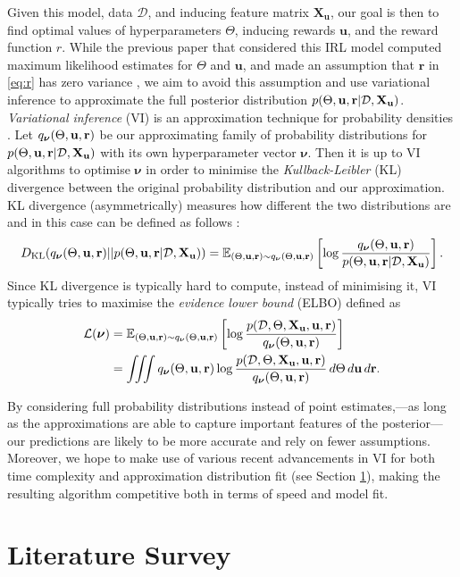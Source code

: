 \documentclass{mprop}
\theoremstyle{definition}
\begin{document}
Given this model, data $\mathcal{D}$, and inducing feature matrix
$\mathbf{X_u}$, our goal is then to find optimal values of hyperparameters
$\Theta$, inducing rewards $\mathbf{u}$, and the reward function $r$. While the
previous paper that considered this IRL model computed maximum likelihood estimates
for $\Theta$ and $\mathbf{u}$, and made an assumption that $\mathbf{r}$ in
\eqref{eq:r} has zero variance \cite{DBLP:conf/nips/LevinePK11}, we aim to
avoid this assumption and use variational inference to approximate the full
posterior distribution $p(\Theta, \mathbf{u}, \mathbf{r} | \mathcal{D}, \mathbf{X_u})$. \emph{Variational inference} (VI) is an
approximation technique for probability densities \cite{blei2017variational}.
Let $q_{\bm\nu}(\Theta, \mathbf{u}, \mathbf{r})$ be our approximating family of probability distributions
for $p(\Theta, \mathbf{u}, \mathbf{r} | \mathcal{D}, \mathbf{X_u})$ with its own hyperparameter vector $\bm\nu$. Then it is up
to VI algorithms to optimise $\bm\nu$ in order to minimise the
\emph{Kullback-Leibler} (KL) divergence between the original probability
distribution and our approximation.  KL divergence (asymmetrically) measures how
different the two distributions are and in this case can be defined as follows
\cite{blei2017variational}:
\[ D_{\mathrm{KL}}(q_{\bm\nu}(\Theta, \mathbf{u}, \mathbf{r}) || p(\Theta, \mathbf{u}, \mathbf{r} | \mathcal{D}, \mathbf{X_u})) = \mathbb{E}_{(\Theta, \mathbf{u}, \mathbf{r}) \sim q_{\bm\nu}(\Theta, \mathbf{u}, \mathbf{r})} \left[ \log
  \frac{q_{\bm\nu}(\Theta, \mathbf{u}, \mathbf{r})}{p(\Theta, \mathbf{u}, \mathbf{r} | \mathcal{D}, \mathbf{X_u})} \right]. \]
Since KL divergence is typically hard to compute, instead of minimising it, VI
typically tries to maximise the \emph{evidence lower bound} (ELBO) defined as
\cite{DBLP:books/lib/Bishop07,blei2017variational}
\[
  \begin{split}
    \mathcal{L}(\bm\nu) &= \mathbb{E}_{(\Theta, \mathbf{u}, \mathbf{r}) \sim q_{\bm\nu}(\Theta, \mathbf{u}, \mathbf{r})} \left[ \log \frac{p(\mathcal{D}, \Theta, \mathbf{X_u}, \mathbf{u}, \mathbf{r})}{q_{\bm\nu}(\Theta, \mathbf{u}, \mathbf{r})}
    \right] \\
    &= \iiint q_{\bm\nu}(\Theta, \mathbf{u}, \mathbf{r}) \log
    \frac{p(\mathcal{D}, \Theta, \mathbf{X_u}, \mathbf{u}, \mathbf{r})}{q_{\bm\nu}(\Theta, \mathbf{u}, \mathbf{r})}\,d\Theta\,d\mathbf{u}\,d\mathbf{r}.
  \end{split}
\]

By considering full probability distributions instead of point estimates,---as
long as the approximations are able to capture important features of the
posterior---our predictions are likely to be more accurate and rely on fewer
assumptions. Moreover, we hope to make use of various recent advancements in VI
for both time complexity and approximation distribution fit (see Section
\ref{literature}), making the resulting algorithm competitive both in terms of
speed and model fit.

\section{Literature Survey} \label{literature}
\end{document}
